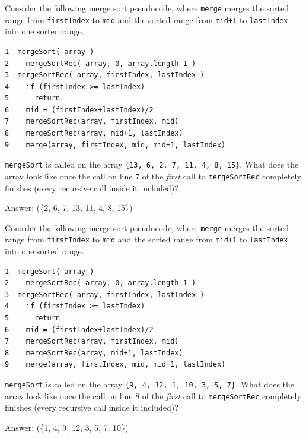 \begin{question}
Consider the following merge sort pseudocode, where \lstinline|merge| merges the sorted range from \lstinline|firstIndex| to \lstinline|mid| and the sorted range from \lstinline|mid+1| to \lstinline|lastIndex| into one sorted range.

\begin{lstlisting}[keepspaces=true]
1  mergeSort( array )
2    mergeSortRec( array, 0, array.length-1 )
3  mergeSortRec( array, firstIndex, lastIndex )
4    if (firstIndex >= lastIndex)
5      return
6    mid = (firstIndex+lastIndex)/2
7    mergeSortRec(array, firstIndex, mid)
8    mergeSortRec(array, mid+1, lastIndex)
9    merge(array, firstIndex, mid, mid+1, lastIndex)
\end{lstlisting}

\lstinline|mergeSort| is called on the array \lstinline|{13, 6, 2, 7, 11, 4, 8, 15}|.
What does the array look like once the call on line 7 of the \emph{first} call to \lstinline|mergeSortRec| completely finishes (every recursive call inside it included)?

Answer: \underline{\hspace{2.5in}} \ifanswers (\{2, 6, 7, 13, 11, 4, 8, 15\})\fi
\end{question}

\begin{question}
Consider the following merge sort pseudocode, where \lstinline|merge| merges the sorted range from \lstinline|firstIndex| to \lstinline|mid| and the sorted range from \lstinline|mid+1| to \lstinline|lastIndex| into one sorted range.

\begin{lstlisting}[keepspaces=true]
1  mergeSort( array )
2    mergeSortRec( array, 0, array.length-1 )
3  mergeSortRec( array, firstIndex, lastIndex )
4    if (firstIndex >= lastIndex)
5      return
6    mid = (firstIndex+lastIndex)/2
7    mergeSortRec(array, firstIndex, mid)
8    mergeSortRec(array, mid+1, lastIndex)
9    merge(array, firstIndex, mid, mid+1, lastIndex)
\end{lstlisting}

\lstinline|mergeSort| is called on the array \lstinline|{9, 4, 12, 1, 10, 3, 5, 7}|.
What does the array look like once the call on line 8 of the \emph{first} call to \lstinline|mergeSortRec| completely finishes (every recursive call inside it included)?

Answer: \underline{\hspace{2.5in}} \ifanswers (\{1, 4, 9, 12, 3, 5, 7, 10\})\fi
\end{question}

